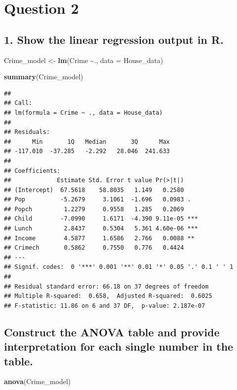 \documentclass[
]{article}
\newenvironment{Shaded}{\begin{snugshade}}{\end{snugshade}}
\newcommand{\AttributeTok}[1]{\textcolor[rgb]{0.13,0.29,0.53}{#1}}
\newcommand{\FunctionTok}[1]{\textcolor[rgb]{0.13,0.29,0.53}{\textbf{#1}}}
\newcommand{\NormalTok}[1]{#1}
\newcommand{\OtherTok}[1]{\textcolor[rgb]{0.56,0.35,0.01}{#1}}
\newcommand{\SpecialCharTok}[1]{\textcolor[rgb]{0.81,0.36,0.00}{\textbf{#1}}}
\begin{document}
\section{Question 2}\label{question-2}

\subsection{1. Show the linear regression output in
R.}\label{show-the-linear-regression-output-in-r.}

\begin{Shaded}
\begin{Highlighting}[]
\NormalTok{Crime\_model }\OtherTok{\textless{}{-}} \FunctionTok{lm}\NormalTok{(Crime }\SpecialCharTok{\textasciitilde{}}\NormalTok{., }\AttributeTok{data =}\NormalTok{ House\_data)}

\FunctionTok{summary}\NormalTok{(Crime\_model)}
\end{Highlighting}
\end{Shaded}

\begin{verbatim}
## 
## Call:
## lm(formula = Crime ~ ., data = House_data)
## 
## Residuals:
##      Min       1Q   Median       3Q      Max 
## -117.010  -37.285   -2.292   28.046  241.633 
## 
## Coefficients:
##             Estimate Std. Error t value Pr(>|t|)    
## (Intercept)  67.5618    58.8035   1.149   0.2580    
## Pop          -5.2679     3.1061  -1.696   0.0983 .  
## Popch         1.2279     0.9558   1.285   0.2069    
## Child        -7.0990     1.6171  -4.390 9.11e-05 ***
## Lunch         2.8437     0.5304   5.361 4.60e-06 ***
## Income        4.5877     1.6586   2.766   0.0088 ** 
## Crimech       0.5862     0.7550   0.776   0.4424    
## ---
## Signif. codes:  0 '***' 0.001 '**' 0.01 '*' 0.05 '.' 0.1 ' ' 1
## 
## Residual standard error: 66.18 on 37 degrees of freedom
## Multiple R-squared:  0.658,  Adjusted R-squared:  0.6025 
## F-statistic: 11.86 on 6 and 37 DF,  p-value: 2.187e-07
\end{verbatim}

\subsection{Construct the ANOVA table and provide interpretation for
each single number in the
table.}\label{construct-the-anova-table-and-provide-interpretation-for-each-single-number-in-the-table.}

\begin{Shaded}
\begin{Highlighting}[]
\FunctionTok{anova}\NormalTok{(Crime\_model)}
\end{Highlighting}
\end{Shaded}
\end{document}
